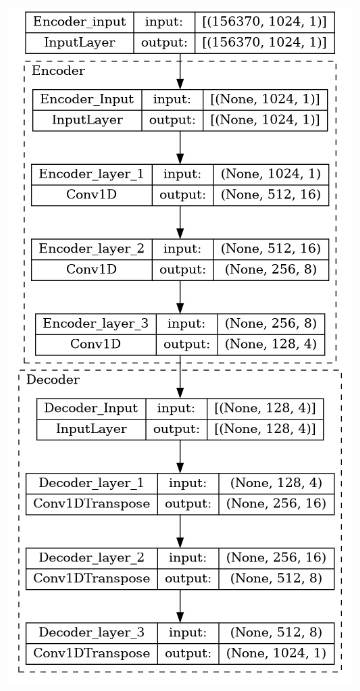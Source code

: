 \renewcommand{\thepage}{}
\begin{appendices}
	\begin{figure}
		\begin{subfigure}{.5\textwidth}
			\includegraphics[width=\linewidth]{../../Images/CR_2.png}

\end{subfigure}
\end{figure}
\end{appendices}
